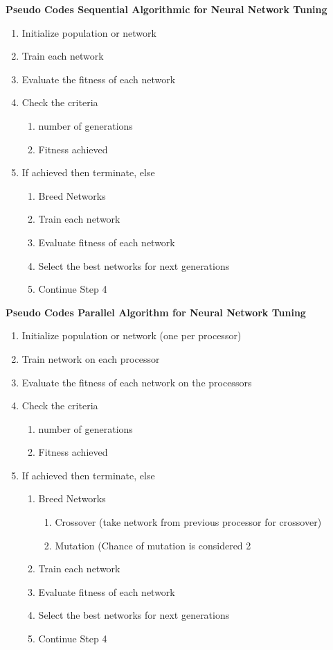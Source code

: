\textbf{Pseudo Codes Sequential Algorithmic for Neural Network Tuning}
\begin{enumerate}
	\item Initialize population or network
	\item Train each network
	\item Evaluate the fitness of each network
	\item Check the criteria
	\begin{enumerate}
		\item number of generations
		\item Fitness achieved
	\end{enumerate}
	\item If achieved then terminate, else
	\begin{enumerate}
		\item Breed Networks
		\item Train each network
		\item Evaluate fitness of each network
		\item Select the best networks for next generations
		\item Continue Step 4
	\end{enumerate}
\end{enumerate}



\textbf{Pseudo Codes Parallel Algorithm for Neural Network Tuning}

\begin{enumerate}
	
	\item Initialize population or network (one per processor)
	\item Train network on each processor
	\item Evaluate the fitness of each network on the processors
	\item Check the criteria
	\begin{enumerate}
		\item number of generations
		\item Fitness achieved
	\end{enumerate}
	\item If achieved then terminate, else
	\begin{enumerate}
		\item Breed Networks
		\begin{enumerate}
			\item Crossover (take network from previous processor for crossover)
			\item Mutation (Chance of mutation is considered 2%
		\end{enumerate}
		\item Train each network
		\item Evaluate fitness of each network
		\item Select the best networks for next generations
		\item Continue Step 4
	\end{enumerate}
\end{enumerate}


